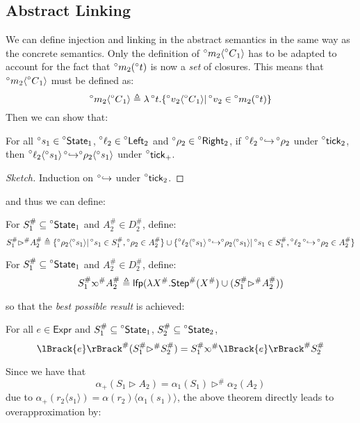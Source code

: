 \documentclass[acmsmall,screen,review]{acmart}\settopmatter{printfolios=true,printccs=false,printacmref=false}
\newcommand*{\A}[1]{\prescript{\circ}{}{#1}}
\newcommand*{\Abs}[1]{{#1}^{\#}}
\newcommand*{\Expr}{\mathsf{Expr}}
\newcommand*{\Left}{\mathsf{Left}}
\newcommand*{\Right}{\mathsf{Right}}
\newcommand*{\mem}{m}
\newcommand*{\State}{\mathsf{State}}
\newcommand*{\lfp}{\mathsf{lfp}}
\newcommand*{\Step}{\mathsf{Step}}
\newcommand*{\semarrow}{\hookrightarrow}
\newcommand*{\semlink}{\mathbin{\rotatebox[origin=c]{180}{$\propto$}}}
\newcommand*{\sembracket}[1]{\lBrack{#1}\rBrack}
\newcommand*{\tick}{\mathsf{tick}}
\newcommand*{\inject}[2]{{#2}\langle{#1}\rangle}
\begin{document}
\subsection{Abstract Linking}
We can define injection and linking in the abstract semantics in the same way as the concrete semantics.
Only the definition of $\inject{\A{C}_1}{\A\mem_2}$ has to be adapted to account for the fact that $\A\mem_2(\A{t})$ is now a \emph{set} of closures.
This means that $\inject{\A{C}_1}{\A\mem_2}$ must be defined as:
\[\inject{\A{C}_1}{\A\mem_2}\triangleq\lambda\A{t}.\{\inject{\A{C}_1}{\A{v}_2}|\A{v}_2\in\A\mem_2(\A{t})\}\]
Then we can show that:
\begin{lemma}
  For all $\A{s}_1\in\A\State_1$, $\A\ell_2\in\A\Left_2$ and $\A\rho_2\in\A\Right_2$, if $\A\ell_2\A\semarrow\A\rho_2$ under $\A\tick_2$,
  then $\inject{\A{s}_1}{\A\ell_2}\A\semarrow\inject{\A{s}_1}{\A\rho_2}$ under $\A\tick_+$.
\end{lemma}
\begin{proof}[Sketch]
  Induction on $\A\semarrow$ under $\A\tick_2$.
\end{proof}
and thus we can define:
\begin{definition}
  For $\Abs{S}_1\subseteq\A\State_1$ and $\Abs{A}_2\in\Abs{D}_2$, define:
  \[
    \Abs{S}_1\Abs\rhd\Abs{A}_2\triangleq\{\inject{\A{s}_1}{\A\rho_2}|\A{s}_1\in\Abs{S}_1,\A\rho_2\in\Abs{A}_2\}\cup\{\inject{\A{s}_1}{\A\ell_2}\A\semarrow\inject{\A{s}_1}{\A\rho_2}|\A{s}_1\in\Abs{S}_1,\A\ell_2\A\semarrow\A\rho_2\in\Abs{A}_2\}
  \]
\end{definition}
\begin{definition}
  For $\Abs{S}_1\subseteq\A\State_1$ and $\Abs{A}_2\in\Abs{D}_2$, define:
  \[
    \Abs{S}_1\Abs\semlink\Abs{A}_2\triangleq\lfp(\lambda\Abs{X}.\Abs\Step(\Abs{X})\cup(\Abs{S}_1\Abs\rhd\Abs{A}_2))
  \]
\end{definition}
so that the \emph{best possible result} is achieved:
\begin{theorem}
  For all $e\in\Expr$ and $\Abs{S}_1\subseteq\A\State_1$, $\Abs{S}_2\subseteq\A\State_2$,
  \[
    \Abs{\sembracket{e}}(\Abs{S}_1\Abs\rhd\Abs{S}_2)=\Abs{S}_1\Abs\semlink\Abs{\sembracket{e}}\Abs{S}_2
  \]
\end{theorem}
Since we have that
\[
  \alpha_+(S_1\rhd A_2)=\alpha_1(S_1)\Abs\rhd\alpha_2(A_2)
\]
due to $\alpha_+(\inject{s_1}{r_2})=\inject{\alpha_1(s_1)}{\alpha(r_2)}$, the above theorem directly leads to overapproximation by:
\end{document}
